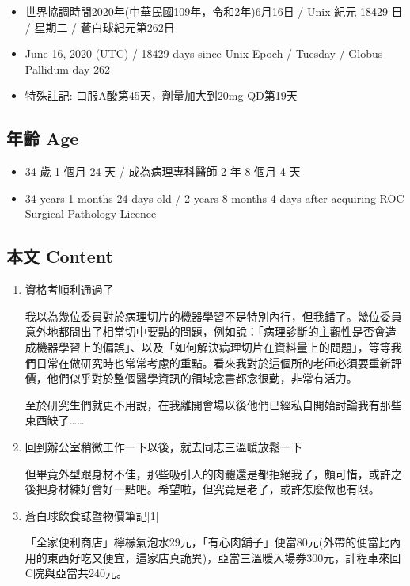 \documentclass[a5paper, 11pt
]{book}
\providecommand{\tightlist}{%
  \setlength{\itemsep}{0pt}\setlength{\parskip}{0pt}}
\begin{document}
\begin{itemize}
\tightlist
\item
  世界協調時間2020年(中華民國109年，令和2年)6月16日 / Unix 紀元 18429 日
  / 星期二 / 蒼白球紀元第262日
\item
  June 16, 2020 (UTC) / 18429 days since Unix Epoch / Tuesday / Globus
  Pallidum day 262
\item
  特殊註記: 口服A酸第45天，劑量加大到20mg QD第19天
\end{itemize}

\hypertarget{ux5e74ux9f61-age-15}{%
\subsection{年齡 Age}\label{ux5e74ux9f61-age-15}}

\begin{itemize}
\tightlist
\item
  34 歲 1 個月 24 天 / 成為病理專科醫師 2 年 8 個月 4 天
\item
  34 years 1 months 24 days old / 2 years 8 months 4 days after
  acquiring ROC Surgical Pathology Licence
\end{itemize}

\hypertarget{ux672cux6587-content-15}{%
\subsection{本文 Content}\label{ux672cux6587-content-15}}

\begin{enumerate}
\def\labelenumi{\arabic{enumi}.}
\item
  資格考順利通過了

  我以為幾位委員對於病理切片的機器學習不是特別內行，但我錯了。幾位委員意外地都問出了相當切中要點的問題，例如說：「病理診斷的主觀性是否會造成機器學習上的偏誤」、以及「如何解決病理切片在資料量上的問題」，等等我們日常在做研究時也常常考慮的重點。看來我對於這個所的老師必須要重新評價，他們似乎對於整個醫學資訊的領域念書都念很勤，非常有活力。

  至於研究生們就更不用說，在我離開會場以後他們已經私自開始討論我有那些東西缺了\ldots\ldots{}
\item
  回到辦公室稍微工作一下以後，就去同志三溫暖放鬆一下

  但畢竟外型跟身材不佳，那些吸引人的肉體還是都拒絕我了，頗可惜，或許之後把身材練好會好一點吧。希望啦，但究竟是老了，或許怎麼做也有限。
\item
  蒼白球飲食誌暨物價筆記{[}1{]}

  「全家便利商店」檸檬氣泡水29元，「有心肉舖子」便當80元(外帶的便當比內用的東西好吃又便宜，這家店真詭異)，亞當三溫暖入場券300元，計程車來回C院與亞當共240元。
\end{enumerate}
\end{document}
